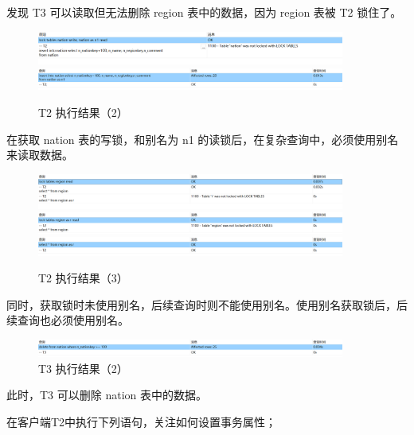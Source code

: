 \documentclass{article}
\begin{document}
发现 T3 可以读取但无法删除 region 表中的数据，因为 region 表被 T2 锁住了。

\begin{figure}[H]
  \centering
  \includegraphics[width=0.9\textwidth]{img/31.png}
  \includegraphics[width=0.9\textwidth]{img/32.png}
  \caption{T2 执行结果（2）}
\end{figure}

在获取 nation 表的写锁，和别名为 n1 的读锁后，在复杂查询中，必须使用别名来读取数据。

\begin{figure}[H]
  \centering
  \includegraphics[width=0.9\textwidth]{img/33.png}
  \includegraphics[width=0.9\textwidth]{img/34.png}
  \includegraphics[width=0.9\textwidth]{img/35.png}
  \caption{T2 执行结果（3）}
\end{figure}

同时，获取锁时未使用别名，后续查询时则不能使用别名。使用别名获取锁后，后续查询也必须使用别名。

\begin{figure}[H]
  \centering
  \includegraphics[width=0.9\textwidth]{img/36.png}
  \caption{T3 执行结果（2）}
\end{figure}

此时，T3 可以删除 nation 表中的数据。

在客户端T2中执行下列语句，关注如何设置事务属性；
\end{document}
